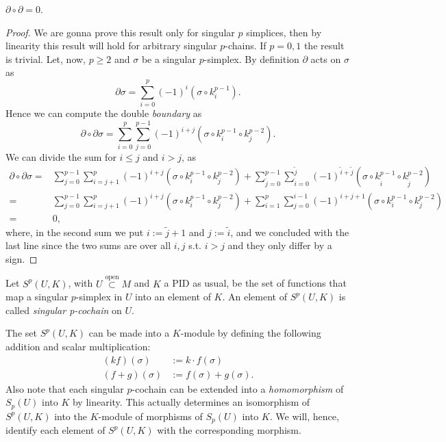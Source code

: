 \begin{lem}
	$\partial \circ \partial = 0$.
\end{lem}
\begin{proof}
	We are gonna prove this result only for singular $p$ simplices, then by linearity this result will hold for arbitrary singular $p$-chains.
	If $p = 0, 1$ the result is trivial.
	Let, now, $p \geq 2$ and $\sigma$ be a singular $p$-simplex.
	By definition $\partial$ acts on $\sigma$ as
	\begin{equation}
		\partial \sigma = \sum_{i=0}^{p} (-1)^i \left( \sigma \circ k_i^{p-1} \right)
	.\end{equation} 
	Hence we can compute the double \textit{boundary} as
	\begin{equation}
	\partial \circ \partial \sigma = \sum_{i=0}^{p} \sum_{j=0}^{p-1} (-1)^{i+j} \left( \sigma \circ k_i^{p-1} \circ k_j^{p-2} \right)
	.\end{equation} 
	We can divide the sum for $i \leq j$ and $i > j$, as
	\begin{align}
		\partial \circ \partial \sigma =& \sum_{j=0}^{p-1} \sum_{i=j+1}^{p} (-1)^{i+j} \left( \sigma \circ k_i^{p-1} \circ k_j^{p-2} \right) +
	\sum_{\tilde{j}=0}^{p-1} \sum_{\tilde{i}=0}^{\tilde{j}} (-1)^{\tilde{i} + \tilde{j}} \left( \sigma \circ k_{\tilde{i}}^{p-1} \circ k_{\tilde{j}}^{p-2} \right)\\
		=& \sum_{j=0}^{p-1} \sum_{i=j+1}^{p} (-1)^{i+j} \left( \sigma \circ k_i^{p-1} \circ k_j^{p-2} \right) + 
\sum_{i=1}^{p} \sum_{j=0}^{i-1} (-1)^{i+j+1} \left( \sigma \circ k_i^{p-1} \circ k_j^{p-2} \right)\\
		=& 0
	,\end{align} 
	where, in the second sum we put $i := \tilde{j} + 1$ and $j := \tilde{i}$, and we concluded with the last line since the two sums are over all $i,j$ s.t. $i > j$ and they only differ by a sign.
\end{proof}

\begin{defn}
	Let $S^p \left(U, K\right)$, with $U \stackrel{\text{open}}{\subset} M$ and $K$ a PID as usual, be the set of functions that map a singular $p$-simplex in $U$ into an element of $K$.
	An element of $S^p \left(U, K\right)$ is called \textit{singular p-cochain} on $U$.
\end{defn}

The set $S^p \left(U, K\right)$ can be made into a $K$-module by defining the following addition and scalar multiplication:
\begin{align}
	\left( kf \right) (\sigma) &:= k \cdot f(\sigma)\\
	\left( f + g \right) (\sigma) &:= f(\sigma) + g(\sigma)
.\end{align} 
Also note that each singular $p$-cochain can be extended into a \textit{homomorphism} of $S_p(U)$ into $K$ by linearity.
This actually determines an isomorphism of $S^p \left(U, K\right)$ into the $K$-module of morphisms of $S_p(U)$ into $K$.
We will, hence, identify each element of $S^p(U,K)$ with the corresponding morphism.

